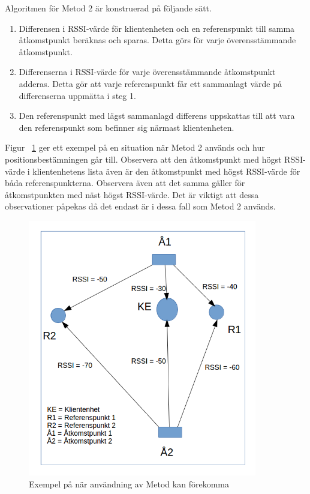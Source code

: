 \documentclass[a4paper,12pt]{article}
\begin{document}
 Algoritmen för Metod 2 är konstruerad på följande sätt.

 \begin{enumerate}
   \item Differensen i RSSI-värde för klientenheten och en referenspunkt till samma åtkomstpunkt beräknas och sparas. Detta görs för varje överensstämmande åtkomstpunkt.
   \item Differenserna i RSSI-värde för varje överensstämmande åtkomstpunkt adderas. Detta gör att varje referenspunkt får ett sammanlagt värde på differenserna uppmätta i steg 1.
   \item Den referenspunkt med lägst sammanlagd differens uppskattas till att vara den referenspunkt som befinner sig närmast klientenheten.
 \end{enumerate}


 Figur ~\ref{fig:MET2} ger ett exempel på en situation när Metod 2 används och hur positionsbestämningen går till. Observera att den åtkomstpunkt med högst RSSI-värde i klientenhetens lista även är den åtkomstpunkt med högst RSSI-värde för båda referenspunkterna. Observera även att det samma gäller för åtkomstpunkten med näst högst RSSI-värde. Det är viktigt att dessa observationer påpekas då det endast är i dessa fall som Metod 2 används.

 \begin{figure}[H]
   \centering
   \includegraphics[width=10cm]{media/MET2.png}
   \caption{Exempel på när användning av Metod kan förekomma}
   \label{fig:MET2}
 \end{figure}
\end{document}

